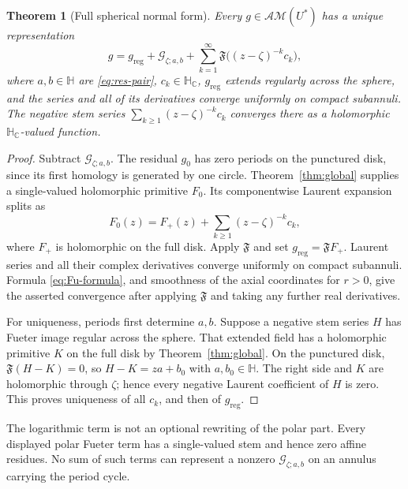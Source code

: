 \documentclass[11pt,a4paper]{article}
\numberwithin{equation}{section}
\newtheorem{theorem}{Theorem}[section]
\theoremstyle{definition}
\theoremstyle{remark}
\newcommand{\C}{\mathbb C}
\newcommand{\HH}{\mathbb H}
\newcommand{\HC}{\mathbb H_{\C}}
\newcommand{\Fu}{\mathfrak F}
\newcommand{\AM}{\mathcal{AM}}
\newcommand{\G}{\mathcal G}
\begin{document}
\begin{theorem}[Full spherical normal form]\label{thm:laurent-log}
Every $g\in\AM(U^*)$ has a unique representation
\begin{equation}\label{eq:full-normal}
 g=g_{\mathrm{reg}}+\G_{\zeta;a,b}
       +\sum_{k=1}^{\infty}\Fu\bigl((z-\zeta)^{-k}c_k\bigr),
\end{equation}
where $a,b\in\HH$ are \eqref{eq:res-pair}, $c_k\in\HC$,
$g_{\mathrm{reg}}$ extends regularly across the sphere, and the series
and all of its derivatives converge uniformly on compact subannuli.
The negative stem series $\sum_{k\ge1}(z-\zeta)^{-k}c_k$ converges
there as a holomorphic $\HC$-valued function.
\end{theorem}
\begin{proof}
Subtract $\G_{\zeta;a,b}$. The residual $g_0$ has zero periods on the
punctured disk, since its first homology is generated by one circle.
Theorem~\ref{thm:global} supplies a single-valued holomorphic primitive
$F_0$. Its componentwise Laurent expansion splits as
\[
 F_0(z)=F_+(z)+\sum_{k\ge1}(z-\zeta)^{-k}c_k,
\]
where $F_+$ is holomorphic on the full disk. Apply $\Fu$ and set
$g_{\mathrm{reg}}=\Fu F_+$. Laurent series and all their complex
derivatives converge uniformly on compact subannuli. Formula
\eqref{eq:Fu-formula}, and smoothness of the axial coordinates for
$r>0$, give the asserted convergence after applying $\Fu$ and taking
any further real derivatives.

For uniqueness, periods first determine $a,b$. Suppose a negative stem
series $H$ has Fueter image regular across the sphere. That extended
field has a holomorphic primitive $K$ on the full disk by
Theorem~\ref{thm:global}. On the punctured disk,
$\Fu(H-K)=0$, so $H-K=za+b_0$ with $a,b_0\in\HH$.
The right side and $K$ are holomorphic through $\zeta$; hence every
negative Laurent coefficient of $H$ is zero. This proves uniqueness of
all $c_k$, and then of $g_{\mathrm{reg}}$.
\end{proof}

The logarithmic term is not an optional rewriting of the polar part.
Every displayed polar Fueter term has a single-valued stem and hence
zero affine residues. No sum of such terms can represent a nonzero
$\G_{\zeta;a,b}$ on an annulus carrying the period cycle.
\end{document}
